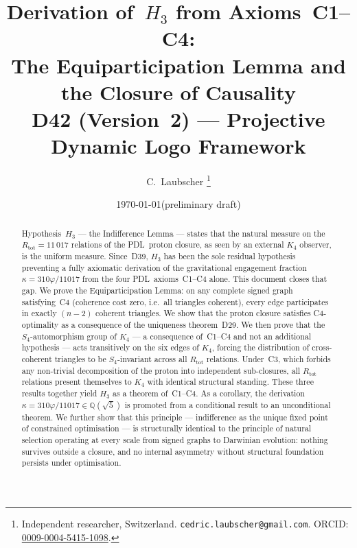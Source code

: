 \documentclass[11pt,a4paper]{article}
\theoremstyle{plain}
\theoremstyle{definition}
\theoremstyle{remark}
\newcommand{\PDL}{\textnormal{PDL}}
\newcommand{\Kfour}{K_4}
\newcommand{\Rtot}{R_{\mathrm{tot}}}
\newcommand{\vp}{\varphi}
\newcommand{\kap}{\kappa}
\begin{document}
\title{%
  Derivation of~$H_3$ from Axioms~C1--C4:\\
  The Equiparticipation Lemma and the Closure of Causality\\[4pt]
  \large\normalfont D42 (Version~2) --- Projective Dynamic Logo Framework%
}
\author{%
  C.~Laubscher%
  \thanks{Independent researcher, Switzerland.
    \texttt{cedric.laubscher@gmail.com}.
    ORCID: \href{https://orcid.org/0009-0004-5415-1098}{0009-0004-5415-1098}.}\\[4pt]
}
\date{\small\today\quad(preliminary draft)}
\maketitle

\begin{abstract}
Hypothesis~$H_3$ --- the Indifference Lemma --- states that the natural measure on the $\Rtot = 11\,017$ relations of the \PDL\ proton closure, as seen by an external $\Kfour$ observer, is the uniform measure. Since~D39, $H_3$ has been the sole residual hypothesis preventing a fully axiomatic derivation of the gravitational engagement fraction $\kap = 310\vp/11017$ from the four \PDL\ axioms~C1--C4 alone. This document closes that gap. We prove the Equiparticipation Lemma: on any complete signed graph satisfying~C4 (coherence cost zero, i.e.\ all triangles coherent), every edge participates in exactly $(n-2)$ coherent triangles. We show that the proton closure satisfies C4-optimality as a consequence of the uniqueness theorem~D29. We then prove that the $S_4$-automorphism group of $\Kfour$ --- a consequence of~C1--C4 and not an additional hypothesis --- acts transitively on the six edges of $\Kfour$, forcing the distribution of cross-coherent triangles to be $S_4$-invariant across all $\Rtot$ relations. Under~C3, which forbids any non-trivial decomposition of the proton into independent sub-closures, all $\Rtot$ relations present themselves to $\Kfour$ with identical structural standing. These three results together yield $H_3$ as a theorem of~C1--C4. As a corollary, the derivation $\kap = 310\vp/11017 \in \mathbb{Q}(\sqrt{5})$ is promoted from a conditional result to an unconditional theorem. We further show that this principle --- indifference as the unique fixed point of constrained optimisation --- is structurally identical to the principle of natural selection operating at every scale from signed graphs to Darwinian evolution: nothing survives outside a closure, and no internal asymmetry without structural foundation persists under optimisation.
\end{abstract}
\end{document}
